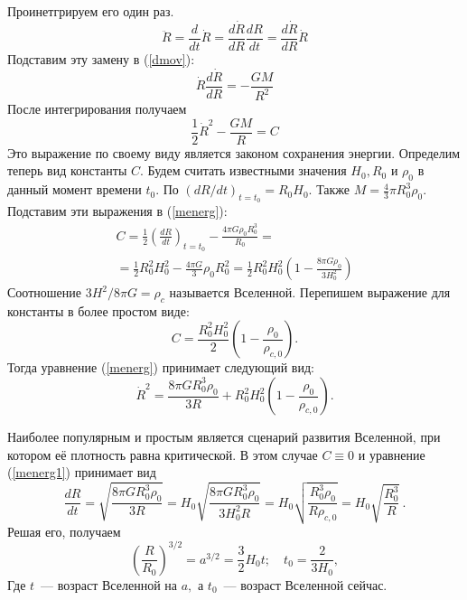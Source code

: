 Проинетгрируем его один раз.
\begin{equation}
\ddot{R} = \frac{d}{dt} \dot{R} = \frac{d \dot{R}}{dR} \frac{dR}{dt} = \frac{d \dot{R}}{dR} \dot{R}
\label{change}
\end{equation}
Подставим эту замену в (\ref{dmov}):
\begin{equation}
\dot{R} \frac{d \dot{R}}{dR} = -\frac{GM}{R^2}
\end{equation}
После интегрирования получаем
\begin{equation}
\frac{1}{2} \dot{R}^2 - \frac{GM}{R} = C
\label{menerg}
\end{equation}
Это выражение по своему виду является законом сохранения энергии. Определим теперь вид константы $C$. Будем считать известными значения $H_0, R_0$ и $\rho_0$ в данный момент времени $t_0$. По  $(dR / dt)_{t = t_0} = R_0H_0$. Также $M = \frac{4}{3} \pi R_{0}^{3} \rho_0$. Подставим эти выражения в (\ref{menerg}):
\begin{multline}
C = \frac{1}{2} \left(\frac{dR}{dt}\right)_{t = t_0} - \frac{4 \pi G \rho_0 R_{0}^{3}}{R_0}  =\\ 
= \frac{1}{2} R_{0}^{2} H_{0}^{2} - \frac{4 \pi G}{3} \rho_0 R_{0}^{2} = \frac{1}{2} R_{0}^{2}H_{0}^{2} \left( 1 - \frac{8 \pi G \rho_0}{3 H_{0}^{2}} \right)
\end{multline}
Соотношение $3H^2 / 8 \pi G = \rho_c$ называется  Вселенной. Перепишем выражение для константы в более простом виде:
\begin{equation}
C = \frac{R_{0}^{2} H_{0}^{2}}{2} \left(1 - \frac{\rho_0}{\rho_{c,0}} \right).
\label{const}
\end{equation}
Тогда уравнение (\ref{menerg}) принимает следующий вид:
\begin{equation}
\dot{R}^2 = \frac{8 \pi G R_{0}^{3} \rho_0}{3R} + R_{0}^{2} H_{0}^{2} \left(1 - \frac{\rho_0}{\rho_{c,0}} \right).
\label{menerg1}
\end{equation}

Наиболее популярным и простым является сценарий развития Вселенной, при котором её плотность равна критической. В этом случае $C \equiv 0$ и уравнение (\ref{menerg1}) принимает вид
\begin{equation}
\frac{dR}{dt} = \sqrt{\frac{8 \pi G R_{0}^{3} \rho_0}{3R}} = H_0 \sqrt{\frac{8 \pi G R_{0}^{3} \rho_0}{3 H_{0}^{2} R}} = H_0 \sqrt{\frac{R_{0}^{3} \rho_0}{R \rho_{c,0}}} = H_0 \sqrt{\frac{R_{0}^{3}}{R}} \, .
\end{equation}
Решая его, получаем
\begin{equation}
\left(\frac{R}{R_0}\right)^{3/2} = a^{3/2} = \frac{3}{2} H_0 t; \quad t_0 = \frac{2}{3 H_0},
\end{equation}
Где $t$~--- возраст Вселенной на  $a,$ а $t_0$~--- возраст Вселенной сейчас.

